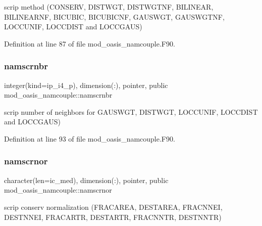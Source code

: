 scrip method (C\+O\+N\+S\+E\+RV, D\+I\+S\+T\+W\+GT, D\+I\+S\+T\+W\+G\+T\+NF, B\+I\+L\+I\+N\+E\+AR, B\+I\+L\+I\+N\+E\+A\+R\+NF, B\+I\+C\+U\+B\+IC, B\+I\+C\+U\+B\+I\+C\+NF, G\+A\+U\+S\+W\+GT, G\+A\+U\+S\+W\+G\+T\+NF, L\+O\+C\+C\+U\+N\+IF, L\+O\+C\+C\+D\+I\+ST and L\+O\+C\+C\+G\+A\+US) 



Definition at line 87 of file mod\+\_\+oasis\+\_\+namcouple.\+F90.

\mbox{\label{namespacemod__oasis__namcouple_a20d614468823744b82118ee8cf2df852}} 
\subsubsection{\texorpdfstring{namscrnbr}{namscrnbr}}
{\footnotesize\ttfamily integer(kind=ip\+\_\+i4\+\_\+p), dimension(\+:), pointer, public mod\+\_\+oasis\+\_\+namcouple\+::namscrnbr}



scrip number of neighbors for G\+A\+U\+S\+W\+GT, D\+I\+S\+T\+W\+GT, L\+O\+C\+C\+U\+N\+IF, L\+O\+C\+C\+D\+I\+ST and L\+O\+C\+C\+G\+A\+US) 



Definition at line 93 of file mod\+\_\+oasis\+\_\+namcouple.\+F90.

\mbox{\label{namespacemod__oasis__namcouple_a392f40531007d5dcc084e6ad4a393fd7}} 
\subsubsection{\texorpdfstring{namscrnor}{namscrnor}}
{\footnotesize\ttfamily character(len=ic\+\_\+med), dimension(\+:), pointer, public mod\+\_\+oasis\+\_\+namcouple\+::namscrnor}



scrip conserv normalization (F\+R\+A\+C\+A\+R\+EA, D\+E\+S\+T\+A\+R\+EA, F\+R\+A\+C\+N\+N\+EI, D\+E\+S\+T\+N\+N\+EI, F\+R\+A\+C\+A\+R\+TR, D\+E\+S\+T\+A\+R\+TR, F\+R\+A\+C\+N\+N\+TR, D\+E\+S\+T\+N\+N\+TR) 



